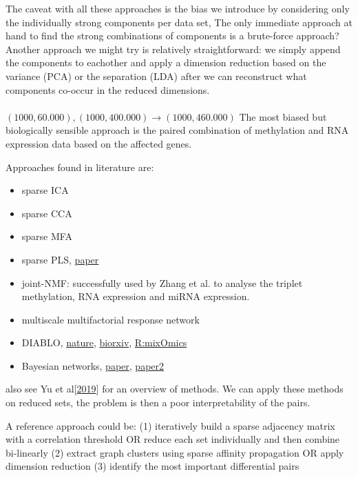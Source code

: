 \documentclass[a4paper,10pt]{article}
\begin{document}
The caveat with all these approaches is the bias we introduce by considering only the individually strong components per data set, 
The only immediate approach at hand to find the strong combinations of components is a brute-force approach?
Another approach we might try is relatively straightforward: we simply append the components to eachother and apply a
dimension reduction based on the variance (PCA) or the separation (LDA) after we can reconstruct what
components co-occur in the reduced dimensions. \\ \\
%
$(1000, 60.000),(1000, 400.000) \rightarrow (1000, 460.000)$
%
The most biased but biologically sensible approach is the paired combination of methylation and RNA expression data
based on the affected genes. 

Approaches found in literature are:
\begin{itemize}
 \item sparse ICA
 \item sparse CCA
 \item sparse MFA
 \item sparse PLS, \href{https://bmcbioinformatics.biomedcentral.com/articles/10.1186/1471-2105-12-253}{paper}
 \item joint-NMF: successfully used by Zhang et al. to analyse the triplet methylation, RNA expression and miRNA expression.
 \item multiscale multifactorial response network 
 \item DIABLO, \href{https://www.nature.com/articles/s41467-019-08794-x.pdf}{nature}, \href{https://www.biorxiv.org/content/10.1101/067611v2}{biorxiv}, \href{https://journals.plos.org/ploscompbiol/article?id=10.1371/journal.pcbi.1005752}{R:mixOmics}
 \item Bayesian networks, \href{https://www.ncbi.nlm.nih.gov/pmc/articles/PMC2701418/}{paper}, \href{https://www.cell.com/cell-systems/fulltext/S2405-4712(17)30548-3}{paper2}
\end{itemize}
%
also see Yu et al[\href{https://www.sciencedirect.com/science/article/pii/S2452310018301197}{2019}] for an overview of methods.
We can apply these methods on reduced sets, the problem is then a poor interpretability of the pairs.

A reference approach could be:
(1) iteratively build a sparse adjacency matrix with a correlation threshold OR reduce each set individually and then combine bi-linearly
(2) extract graph clusters using sparse affinity propagation OR apply dimension reduction
(3) identify the most important differential pairs
%
\end{document}
